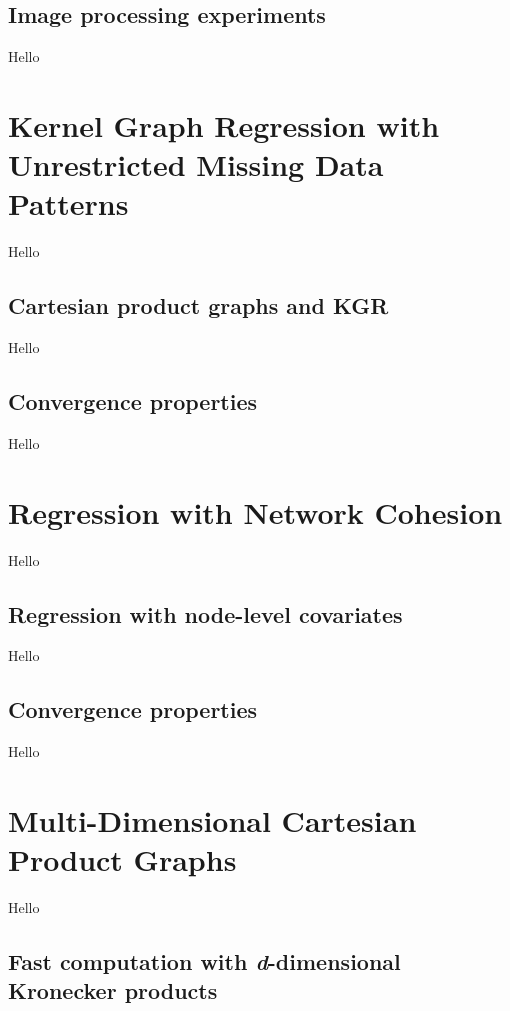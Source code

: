 \subsection{Image processing experiments}

Hello



\section{Kernel Graph Regression with Unrestricted Missing Data Patterns}

\label{sec:kgr_mdp}

Hello

\subsection{Cartesian product graphs and KGR}

Hello

\subsection{Convergence properties}

Hello


\section{Regression with Network Cohesion}

\label{sec:rnc_mdp}

Hello

\subsection{Regression with node-level covariates}

Hello

\subsection{Convergence properties}

Hello


\section{Multi-Dimensional Cartesian Product Graphs}

\label{sec:nd_gsp}

Hello

\subsection{Fast computation with \textit{d}-dimensional Kronecker products}

